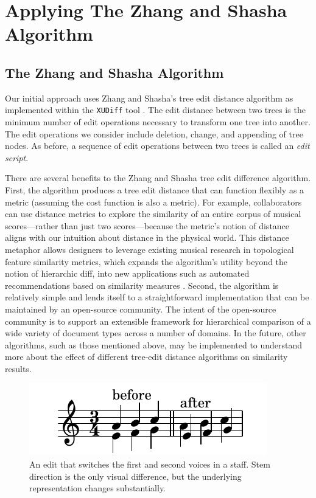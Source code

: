 \documentclass{article}
\begin{document}
\section{Applying The Zhang and Shasha Algorithm}
\subsection{The Zhang and Shasha Algorithm}
Our initial approach uses Zhang and Shasha's tree edit distance
algorithm as implemented within the \texttt{XUDiff} tool
\cite{Weaver:2013sl}.  The edit distance between two trees is the
minimum number of edit operations necessary to transform one tree into
another.  The edit operations we consider include deletion, change,
and appending of tree nodes.  As before, a sequence of edit operations
between two trees is called an \emph{edit script}.



There are several benefits to the Zhang and Shasha tree edit
difference algorithm.  First, the algorithm produces a tree edit
distance that can function flexibly as a metric (assuming the cost function is also a metric). For example, collaborators
can use distance metrics to explore the similarity of an entire corpus of 
musical scores---rather than just two scores---because the metric's notion of distance aligns
with our intuition about distance in the physical world. This distance metaphor allows designers to leverage existing musical research in topological feature similarity metrics, which expands the algorithm's utility beyond the notion of hierarchic diff, into new applications such as automated recommendations based on similarity measures \cite{bello2011measuring,berenzweig2004large,panagakis2010music}. Second, the
algorithm is relatively simple and lends itself to a
straightforward implementation that can be maintained by an
open-source community.  The intent of the open-source community is to
support an extensible framework for hierarchical comparison of a wide
variety of document types across a number of domains.  In the future,
other algorithms, such as those mentioned above, may be implemented to
understand more about the effect of different tree-edit distance
algorithms on similarity results.

\begin{figure}[!htb]
\centering
\includegraphics[width=0.7\columnwidth]{layers.pdf}
\caption{An edit that switches the first and second voices in a staff. Stem direction is the only visual difference, but the underlying representation changes substantially.}
\label{fig:voice_swap}
\end{figure}
\end{document}
